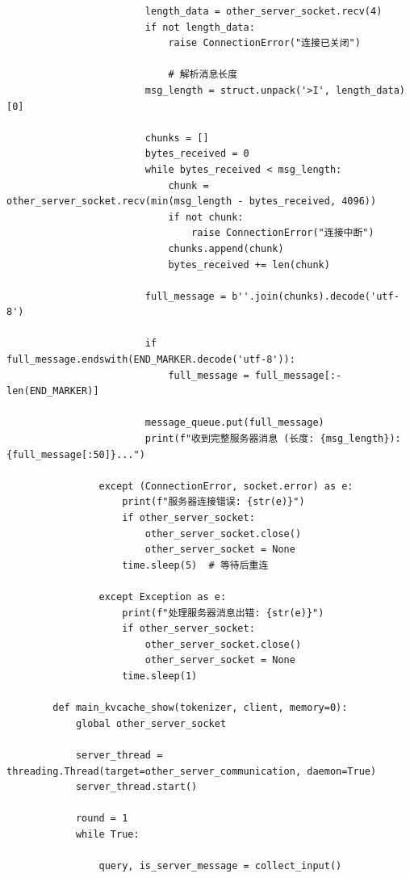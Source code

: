 \documentclass[AutoFakeBold,AutoFakeSlant,language=chinese,degree=bachelor]{sustechthesis}
\begin{document}
\begin{itemize}
\begin{lstlisting}
                        length_data = other_server_socket.recv(4)
                        if not length_data:
                            raise ConnectionError("连接已关闭")
        
                            # 解析消息长度
                        msg_length = struct.unpack('>I', length_data)[0]
        
                        chunks = []
                        bytes_received = 0
                        while bytes_received < msg_length:
                            chunk = other_server_socket.recv(min(msg_length - bytes_received, 4096))
                            if not chunk:
                                raise ConnectionError("连接中断")
                            chunks.append(chunk)
                            bytes_received += len(chunk)
        
                        full_message = b''.join(chunks).decode('utf-8')
        
                        if full_message.endswith(END_MARKER.decode('utf-8')):
                            full_message = full_message[:-len(END_MARKER)]
        
                        message_queue.put(full_message)
                        print(f"收到完整服务器消息 (长度: {msg_length}): {full_message[:50]}...")
        
                except (ConnectionError, socket.error) as e:
                    print(f"服务器连接错误: {str(e)}")
                    if other_server_socket:
                        other_server_socket.close()
                        other_server_socket = None
                    time.sleep(5)  # 等待后重连
        
                except Exception as e:
                    print(f"处理服务器消息出错: {str(e)}")
                    if other_server_socket:
                        other_server_socket.close()
                        other_server_socket = None
                    time.sleep(1)
        
        def main_kvcache_show(tokenizer, client, memory=0):
            global other_server_socket
        
            server_thread = threading.Thread(target=other_server_communication, daemon=True)
            server_thread.start()
        
            round = 1
            while True:
                
                query, is_server_message = collect_input()
        

\end{lstlisting}
\end{itemize}
\end{document}
